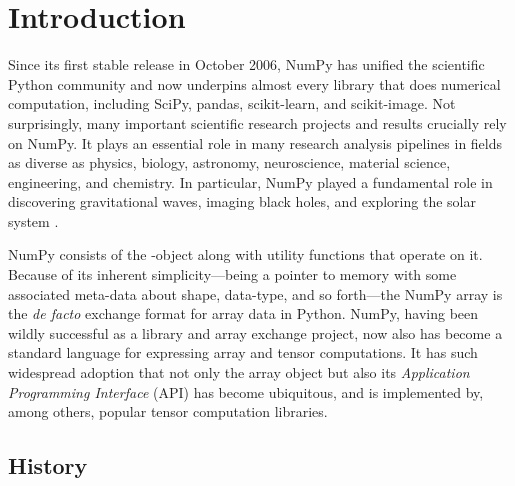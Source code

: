 \section*{Introduction}

Since its first stable release in October 2006, NumPy has unified
the scientific Python community and now underpins almost every library
that does numerical computation, including SciPy\cite{virtanen2019scipy},
pandas\cite{mckinney-proc-scipy-2010}, scikit-learn\cite{pedregosa2011scikit},
and scikit-image\cite{vanderwalt2014scikit}.
Not surprisingly, many important scientific research projects and
results crucially rely on NumPy.
It plays an essential role in many research analysis pipelines in
fields as diverse as physics, biology, astronomy, neuroscience,
material science, engineering, and chemistry.
In particular, NumPy played a fundamental role in discovering
gravitational waves\cite{pycbc}, imaging black
holes\cite{eht-imaging}, and exploring the solar system \cite{jenness2018lsst}.


NumPy consists of the -object along with utility functions that
operate on it.
Because of its inherent simplicity—being a pointer to memory with some
associated meta-data about shape, data-type, and so forth—the NumPy array is
the {\it de facto} exchange format for array data in Python.
NumPy, having been wildly successful as a library and array exchange
project, now also has become a standard language for expressing array and
tensor computations.
It has such widespread adoption that not only the array object but also its
{\it Application Programming Interface} (API) has become ubiquitous, and is
implemented by, among others, popular tensor computation libraries\cite{pytorch}.

\subsection*{History}

